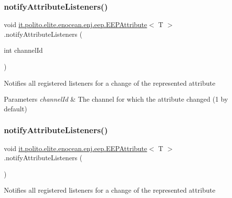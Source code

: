 \subsubsection{\texorpdfstring{notify\+Attribute\+Listeners()}{notifyAttributeListeners()}\hspace{0.1cm}{\footnotesize\ttfamily [1/2]}}
{\footnotesize\ttfamily void \hyperlink{classit_1_1polito_1_1elite_1_1enocean_1_1enj_1_1eep_1_1_e_e_p_attribute}{it.\+polito.\+elite.\+enocean.\+enj.\+eep.\+E\+E\+P\+Attribute}$<$ T $>$.notify\+Attribute\+Listeners (\begin{DoxyParamCaption}\item[{int}]{channel\+Id }\end{DoxyParamCaption})}

Notifies all registered listeners for a change of the represented attribute


\begin{DoxyParams}{Parameters}
{\em channel\+Id} & The channel for which the attribute changed (1 by default) \\
\hline
\end{DoxyParams}
\hypertarget{classit_1_1polito_1_1elite_1_1enocean_1_1enj_1_1eep_1_1_e_e_p_attribute_a70ad35a027789d5b2d32400acfd2cff2}{}\label{classit_1_1polito_1_1elite_1_1enocean_1_1enj_1_1eep_1_1_e_e_p_attribute_a70ad35a027789d5b2d32400acfd2cff2} 
\subsubsection{\texorpdfstring{notify\+Attribute\+Listeners()}{notifyAttributeListeners()}\hspace{0.1cm}{\footnotesize\ttfamily [2/2]}}
{\footnotesize\ttfamily void \hyperlink{classit_1_1polito_1_1elite_1_1enocean_1_1enj_1_1eep_1_1_e_e_p_attribute}{it.\+polito.\+elite.\+enocean.\+enj.\+eep.\+E\+E\+P\+Attribute}$<$ T $>$.notify\+Attribute\+Listeners (\begin{DoxyParamCaption}{ }\end{DoxyParamCaption})}

Notifies all registered listeners for a change of the represented attribute \hypertarget{classit_1_1polito_1_1elite_1_1enocean_1_1enj_1_1eep_1_1_e_e_p_attribute_a22c278357123a4200f105354304aa904}{}\label{classit_1_1polito_1_1elite_1_1enocean_1_1enj_1_1eep_1_1_e_e_p_attribute_a22c278357123a4200f105354304aa904} 
